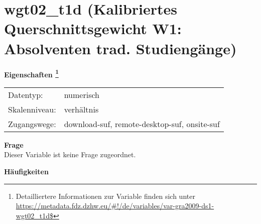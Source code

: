 
    \setcounter{footnote}{0}

    \vspace*{-1.8cm}
	\section{wgt02\_t1d (Kalibriertes Querschnittsgewicht W1: Absolventen trad. Studiengänge)}
	\label{section:wgt02_t1d}



    \vspace*{0.5cm}
    \noindent\textbf{Eigenschaften
	\footnote{Detailliertere Informationen zur Variable finden sich unter
		\url{https://metadata.fdz.dzhw.eu/\#!/de/variables/var-gra2009-ds1-wgt02_t1d$}}}\\
	\begin{tabularx}{\hsize}{@{}lX}
	Datentyp: & numerisch \\
	Skalenniveau: & verhältnis \\
	Zugangswege: &
	  download-suf, 
	  remote-desktop-suf, 
	  onsite-suf
 \\
    \end{tabularx}



		\vspace*{0.5cm}
		\noindent\textbf{Frage}\\
		Dieser Variable ist keine Frage zugeordnet.





        		\vspace*{0.5cm}
                \noindent\textbf{Häufigkeiten}

